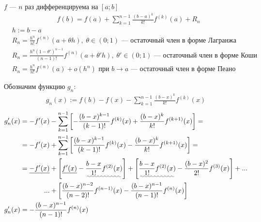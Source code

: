 \documentclass{article}
\begin{document}


$f$ --- $n$ раз дифференцируема на $[a;b]$
\begin{align*}
	 & f(b)=f(a)+\sum_{k=1}^{n-1}\frac{(b-a)^{k}}{k!}f^{(k)}(a)+R_n
\end{align*}
\begin{align*}
	 & h:=b-a                                                                                                                  \\
	 & R_n=\frac{h^n}{n!}f^{(n)}(a+\theta h),\;\theta\in(0;1)\text{ --- остаточный член в форме Лагранжа }                     \\
	 & R_n=\frac{h^{n}(1-\theta')^{n-1}}{(n-1)!}f^{(n)}(a+\theta'h),\;\theta'\in(0;1)\text{ --- остаточный член в форме Коши } \\
	 & R_n=\frac{h^{n}}{n!}f^{(n)}(a)+o(h^{n})\text{ при $b\to a$ --- остаточный член в форме Пеано }
\end{align*}

\proof

Обозначим функцию $g_n$:
\begin{align*}
	g_n(x):=f(b)-f(x)-\sum_{k=1}^{n-1}\frac{(b-x)^{k}}{k!}f^{(k)}(x)
\end{align*}
\begin{align*}
	g_n'(x)
	 & =-f'(x)-\sum_{k=1}^{n-1}\left[-\frac{(b-x)^{k-1}}{(k-1)!}f^{(k)}(x)+\frac{(b-x)^{k}}{k!}f^{(k+1)}(x)\right]=                                                                                                                          \\
	 & =-f'(x)+\sum_{k=1}^{n-1}\left[\frac{(b-x)^{k-1}}{(k-1)!}f^{(k)}(x)-\frac{(b-x)^{k}}{k!}f^{(k+1)}(x)\right]=                                                                                                                           \\
	 & =
	\begin{aligned}[t]
		\underline{-f'(x)} & +\left[\underline{f'(x)}-\uwave{\frac{b-x}{1!}f^{(2)}(x)}\right]+\left[\uwave{\frac{b-x}{1!}f^{(2)}(x)}-\frac{(b-x)^{2}}{2!}f^{(3)}(x)\right]+... \\
		...                & +\left[\frac{(b-x)^{n-2}}{(n-2)!}f^{(n-1)}(x)-\frac{(b-x)^{n-1}}{(n-1)!}f^{(n)}(x)\right]
	\end{aligned} \\
	g_n'(x)
	 & =-\frac{(b-x)^{n-1}}{(n-1)!}f^{(n)}(x)
\end{align*}
\end{document}

